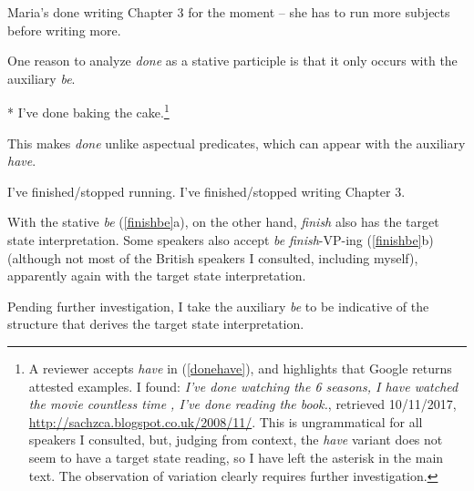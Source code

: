 \documentclass[output=paper]{langsci/langscibook}
\begin{document}
\begin{exe}
\ex\label{writeprog} Maria's done writing Chapter 3 for the moment -- she has to run more subjects before writing more.
\end{exe}

One reason to analyze \emph{done} as a stative participle is that it only
occurs with the auxiliary \emph{be}.

\begin{exe}
\ex\label{donehave} * I've done baking the cake.\footnote{A reviewer accepts \emph{have} in (\ref{donehave}), and highlights that Google returns attested examples. I found: \emph{I've done watching the 6 seasons, I have watched the movie countless time {\normalfont [sic.],} I've done reading the book.}, retrieved 10/11/2017, \url{http://sachzca.blogspot.co.uk/2008/11/}. This is ungrammatical for all speakers I consulted, but, judging from context, the \emph{have} variant does not seem to have a target state reading, so I have left the asterisk in the main text. The observation of variation clearly requires further investigation.}
\end{exe}

This makes \emph{done} unlike aspectual predicates, which can appear with the
auxiliary \emph{have}.

\begin{exe}
\ex\label{stop}
\begin{xlist}
\ex I've finished/stopped running.
\ex I've finished/stopped writing Chapter 3.
\end{xlist}
\end{exe}

With the stative \emph{be} (\ref{finishbe}a), on the other hand, \emph{finish}
also has the target state interpretation. Some speakers also accept \emph{be}
\emph{finish}-VP-ing (\ref{finishbe}b) (although not most of the British
speakers I consulted, including myself), apparently again with the target state
interpretation.

\begin{exe}
\ex\label{finishbe}
\begin{xlist}
\end{xlist}
\end{exe}

Pending further investigation, I take the auxiliary \emph{be} to be
indicative of the structure that derives the target state interpretation.
\end{document}
